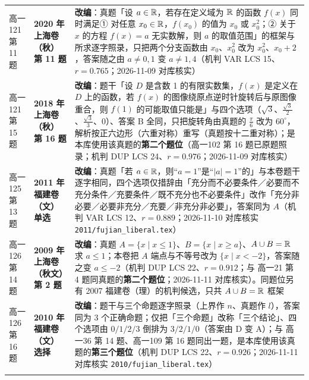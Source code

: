 \documentclass[a4paper,11pt]{article}
\begin{document}
\begin{xltabular}{\textwidth}{@{}>{\raggedright\arraybackslash}p{2.85cm}>{\raggedright\arraybackslash}p{3.99cm}>{\raggedright\arraybackslash}p{7.89cm}@{}}
高一121 第 11 题 & \textbf{2020 年上海卷（秋）第 11 题} & \textbf{改编}：真题「设 \(a\in\mathbb{R}\)，若存在定义域为 \(\mathbb{R}\) 的函数 \(f(x)\) 同时满足① 对任意 \(x_0\in\mathbb{R}\)，\(f(x_0)\) 的值为 \(x_0\) 或 \(x_0^2\)；② 关于 \(x\) 的方程 \(f(x)=a\) 无实数解，则 \(a\) 的取值范围」的框架与所求逐字照录，只把两个分支函数由 \(x_0\)、\(x_0^2\) 改为 \(x_0^2\)、\(x_0+\allowbreak 2\)，答案随之由 \(a\neq0,\allowbreak 1\) 变 \(a\neq1,\allowbreak 4\)（机判 VAR LCS 15、\(r=\allowbreak 0.765\)；2026-11-09 对库核实） \\ \addlinespace[1pt]
高一121 第 15 题 & \textbf{2018 年上海卷（秋）第 16 题} & \textbf{改编}：题干「设 \(D\) 是含数 1 的有限实数集，\(f(x)\) 是定义在 \(D\) 上的函数，若 \(f(x)\) 的图像绕原点逆时针旋转后与原图像重合，则 \(f(1)\) 的可能取值只能是」与四个选项（\(\sqrt3\)、\(\frac{\sqrt3}{2}\)、\(\frac{\sqrt3}{3}\)、\(0\)）、答案 B 全同，只把旋转角由真题的 \(\frac\pi6\) 改为 \(60^\circ\)，解析按正六边形（六重对称）重写（真题按十二重对称）；是本库使用该真题的\textbf{第二个题位}（高一102 第 16 题已原题照录；机判 DUP LCS 24、\(r=\allowbreak 0.976\)；2026-11-09 对库核实） \\ \addlinespace[1pt]
高一125 第 13 题 & \textbf{2011 年福建卷（文）单选} & \textbf{改编}：真题「若 \(a\in\mathbb{R}\)，则``\(a=\allowbreak 1\)''是``\(\lvert a\rvert=\allowbreak 1\)''的」与本卷题干逐字相同，四个选项仅措辞由「充分而不必要条件／必要而不充分条件／充要条件／既不充分也不必要条件」改作「充分非必要／必要非充分／充要／非充分非必要」，答案同为 \(A\)（机判 VAR LCS 12、\(r=\allowbreak 0.889\)；2026-11-10 对库核实 \texttt{2011/\allowbreak{}fujian\_liberal.tex}） \\ \addlinespace[1pt]
高一126 第 14 题 & \textbf{2009 年上海卷（秋文）第 2 题} & \textbf{改编}：真题 \(A=\allowbreak \{x\mid\allowbreak  x\leqslant\allowbreak 1\}\)、\(B=\allowbreak \{x\mid\allowbreak  x\geqslant\allowbreak  a\}\)、\(A\cup\allowbreak  B=\allowbreak \mathbb{R}\) 求 \(a\leqslant\allowbreak 1\)；本卷把 \(A\) 端点与不等号改为 \(\{x\mid\allowbreak  x<-2\}\)，答案随之变 \(a\leqslant\allowbreak -2\)（机判 DUP LCS 22、\(r=\allowbreak 0.912\)；与 高一21 第 4 题同真题的\textbf{第二个题位}；2026-11-11 对库核实）。同题位另有 2007 福建卷（理）的机判候选，只共 \(A\cup\allowbreak  B=\allowbreak \mathbb{R}\) 框架 \\ \addlinespace[1pt]
高一126 第 16 题 & \textbf{2010 年福建卷（文）选择} & \textbf{改编}：题干与三个命题逐字照录（上界作 \(n\)、真题作 \(l\)），答案同为 3 个正确命题；仅把「三个命题」改称「三个结论」、四个选项由 \(0/1/2/3\) 倒排为 \(3/2/1/0\)（答案由 D 变 A）；与 高一36 第 14 题、高一109 第 16 题同出一题，是本库使用该真题的\textbf{第三个题位}（机判 DUP LCS 22、\(r=\allowbreak 0.926\)；2026-11-11 对库核实 \texttt{2010/\allowbreak{}fujian\_liberal.tex}） \\ \addlinespace[1pt]

\end{xltabular}
\end{document}
